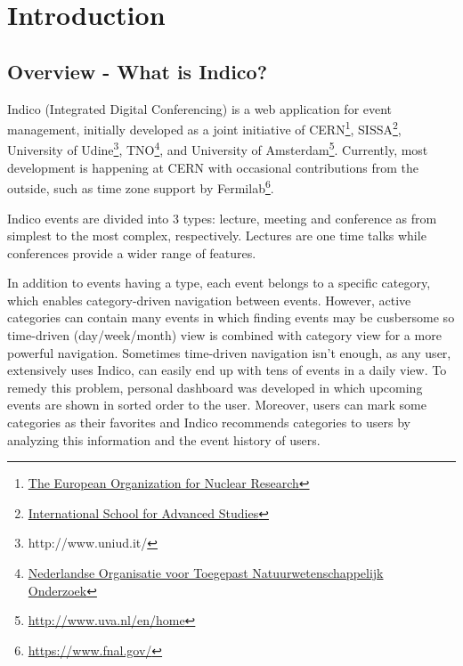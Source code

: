 \chapter{Introduction}

\section{Overview - What is Indico?}

Indico (Integrated Digital Conferencing) is a web application for event management, initially developed as a joint initiative of \textsc{CERN}\footnote{\href{http://home.web.cern.ch/}{The European Organization for Nuclear Research}}, \textsc{SISSA}\footnote{\href{https://www.sissa.it/}{International School for Advanced Studies}}, University of Udine\footnote{http://www.uniud.it/}, \textsc{TNO}\footnote{\href{https://www.tno.nl/}{Nederlandse Organisatie voor Toegepast Natuurwetenschappelijk Onderzoek}}, and University of Amsterdam\footnote{\url{http://www.uva.nl/en/home}}. Currently, most development is happening at CERN with occasional contributions from the outside, such as time zone support by Fermilab\footnote{\url{https://www.fnal.gov/}}.

\par Indico events are divided into 3 types: lecture, meeting and conference as from simplest to the most complex, respectively. Lectures are one time talks while conferences provide a wider range of features.

\par In addition to events having a type, each event belongs to a specific category, which enables category-driven navigation between events. However, active categories can contain many events in which finding events may be cusbersome so time-driven (day/week/month) view is combined with category view for a more powerful navigation. Sometimes time-driven navigation isn't enough, as any user, extensively uses Indico, can easily end up with tens of events in a daily view. To remedy this problem, personal dashboard was developed in which upcoming events are shown in sorted order to the user. Moreover, users can mark some categories as their favorites and Indico recommends categories to users by analyzing this information and the event history of users.

